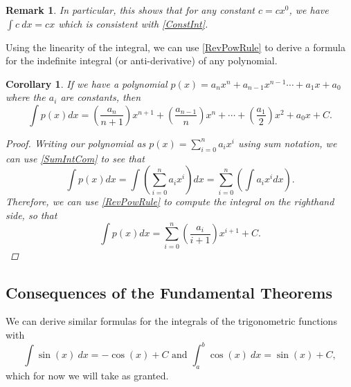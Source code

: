 \documentclass[12pt]{article}
\newtheorem{cor}[thm]{Corollary}
\theoremstyle{definition}
\theoremstyle{plain}
\newtheorem{rem}[thm]{Remark}
\numberwithin{equation}{section}
\begin{document}
\begin{rem}
  In particular, this shows that for any constant $c=cx^0$, we have $\int c\ dx=cx$ which is consistent with \cref{ConstInt}.
\end{rem}

Using the linearity of the integral, we can use \cref{RevPowRule} to derive a formula for the indefinite integral (or anti-derivative) of any polynomial.
\begin{cor}\label{PolyInt}
If we have a polynomial $p(x)=a_nx^n+a_{n-1}x^{n-1}\dotsb+a_1x+a_0$ where the $a_i$ are constants, then
\begin{equation}
  \int p(x)dx= \left(\frac{a_n}{n+1}\right)x^{n+1}+ \left(\frac{a_{n-1}}{n}\right)x^{n}+\dotsb+\left(\frac{a_1}{2}\right)x^2+a_0x+C.
\end{equation}
\begin{proof}
  Writing our polynomial as $p(x)=\sum_{i=0}^{n}a_ix^i$ using sum notation, we can use \cref{SumIntCom} to see that
  \begin{equation}
    \int p(x)dx= \int \left(\sum_{i=0}^{n}a_ix^i\right)dx=\sum_{i=0}^{n}\left( \int a_ix^i dx \right).
  \end{equation}
  Therefore, we can use \cref{RevPowRule} to compute the integral on the righthand side, so that
  \begin{equation}
      \int p(x)dx=\sum_{i=0}^{n}\left( \frac{ a_i}{i+1}\right) x^{i+1}+C.
  \end{equation}
\end{proof}
\end{cor}

\subsection{Consequences of the Fundamental Theorems}


We can derive similar formulas for the integrals of the trigonometric functions with
\begin{equation}
  \int\sin(x)\ dx= -\cos(x)+C
 \text{ and }   \int_{a}^{b}\cos(x)\ dx=\sin(x)+C,
\end{equation}
which for now we will take as granted.


\end{document}
